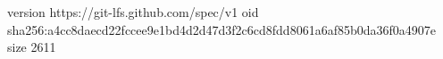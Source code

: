 version https://git-lfs.github.com/spec/v1
oid sha256:a4cc8daecd22fccee9e1bd4d2d47d3f2c6cd8fdd8061a6af85b0da36f0a4907e
size 2611
